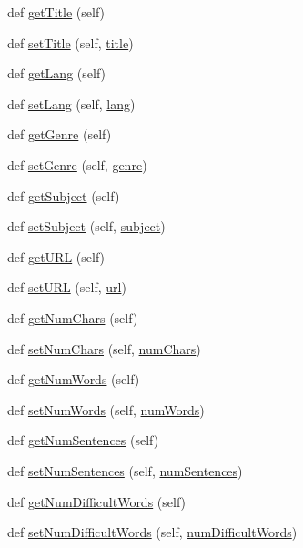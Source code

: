 \begin{DoxyCompactItemize}
\item 
def \hyperlink{class_book_1_1_book_a1a727d9ff491390e1f412550a0a1a085}{get\+Title} (self)
\item 
def \hyperlink{class_book_1_1_book_a7e6d14f5ef76084a2cc4968a6508789e}{set\+Title} (self, \hyperlink{class_book_1_1_book_aae1eab64f0e054709c003a270e86a202}{title})
\item 
def \hyperlink{class_book_1_1_book_aa80fb9893fb613f60a4d4f6b9aae6578}{get\+Lang} (self)
\item 
def \hyperlink{class_book_1_1_book_a473260171cdda228c3dc4ab1abced390}{set\+Lang} (self, \hyperlink{class_book_1_1_book_a00802108d115f37bf17f6fc5170022e9}{lang})
\item 
def \hyperlink{class_book_1_1_book_a03451826cf3a6a2843d27099a75d5334}{get\+Genre} (self)
\item 
def \hyperlink{class_book_1_1_book_a4056207d0b08cd67fda4c72507226cee}{set\+Genre} (self, \hyperlink{class_book_1_1_book_a9e831408f7aa45b9cf66b10613cfaf31}{genre})
\item 
def \hyperlink{class_book_1_1_book_af2c578b6367c85a4c1d532055b520192}{get\+Subject} (self)
\item 
def \hyperlink{class_book_1_1_book_a8f4ec300d24d5a6e9f6664d1860058c8}{set\+Subject} (self, \hyperlink{class_book_1_1_book_a84be9f573910fda354e34de00fc95a61}{subject})
\item 
def \hyperlink{class_book_1_1_book_a60c57a7b990ee481e7e8d3efafc950d9}{get\+U\+R\+L} (self)
\item 
def \hyperlink{class_book_1_1_book_a49214cdce23b923775b544b8e0fc3ba3}{set\+U\+R\+L} (self, \hyperlink{class_book_1_1_book_a365ef43a762948ef862841d4d2f46420}{url})
\item 
def \hyperlink{class_book_1_1_book_a5cd9079f12d86718f9df8e566f5c88d3}{get\+Num\+Chars} (self)
\item 
def \hyperlink{class_book_1_1_book_ae7a0206c29fb9e175abb51ce595c86a4}{set\+Num\+Chars} (self, \hyperlink{class_book_1_1_book_ad3086167cb5f89b8f4de240a00ae64bc}{num\+Chars})
\item 
def \hyperlink{class_book_1_1_book_a8352f92d15b66fd4c4aebd619ce05baa}{get\+Num\+Words} (self)
\item 
def \hyperlink{class_book_1_1_book_a8beb8c69d484c2a0e4c63116be3ba3f1}{set\+Num\+Words} (self, \hyperlink{class_book_1_1_book_accd8ca17020fbb9dc73b7a0b3d9348e2}{num\+Words})
\item 
def \hyperlink{class_book_1_1_book_a6edddaa897389c0250f51d8a6a392262}{get\+Num\+Sentences} (self)
\item 
def \hyperlink{class_book_1_1_book_aeac3717984fd8576a23f2784d879a89d}{set\+Num\+Sentences} (self, \hyperlink{class_book_1_1_book_a750700b9cc757c9b23ab2c5030731543}{num\+Sentences})
\item 
def \hyperlink{class_book_1_1_book_aa5a3abf812d967bae0f53a16ec878330}{get\+Num\+Difficult\+Words} (self)
\item 
def \hyperlink{class_book_1_1_book_a1fbc22c45b29980164469329a492b8fd}{set\+Num\+Difficult\+Words} (self, \hyperlink{class_book_1_1_book_a87b247900d6c59f9a7ad179ad4214148}{num\+Difficult\+Words})
\end{DoxyCompactItemize}
